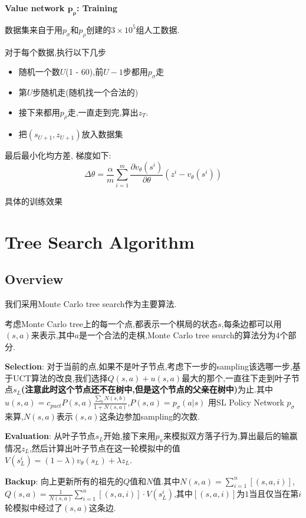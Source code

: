 \documentclass[twocolumn]{article}
\begin{document}
\noindent \textbf{Value network $\bm{p_\rho}$: Training}

数据集来自于用$p_\sigma$和$p_\rho$创建的$3 \times 10^5$组人工数据.

对于每个数据,执行以下几步

\begin{itemize}
	\item 随机一个数$U$(1 - 60),前$U-1$步都用$p_\sigma$走
	\item 第$U$步随机走(随机找一个合法的)
	\item 接下来都用$p_\rho$走,一直走到完,算出$z_T$.
	\item 把$(s_{U+1}, z_{U+1})$放入数据集
\end{itemize}

最后最小化均方差, 梯度如下: 
\[
\Delta\theta = \frac{\alpha}{m} \sum_{i=1}^m\frac{\partial v_\theta(s^i)}{\partial \theta}(z^i - v_\theta(s^i))
\]

\textcolor[rgb]{1,0,0}{具体的训练效果}

\section{Tree Search Algorithm}

\subsection{Overview}

我们采用Monte Carlo tree search作为主要算法.

考虑Monte Carlo tree上的每一个点,都表示一个棋局的状态$s$,每条边都可以用$(s, a)$来表示,其中$a$是一个合法的走棋,Monte Carlo tree search的算法分为4个部分.

\noindent\textbf{Selection}: 对于当前的点,如果不是叶子节点,考虑下一步的sampling该选哪一步,基于UCT算法的改良,我们选择$Q(s, a) + u(s, a)$最大的那个,一直往下走到叶子节点$s_L$\textbf{(注意此时这个节点还不在树中,但是这个节点的父亲在树中)}为止.其中$u(s, a) = c_{puct}P(s, a)\frac{\sum_{b}N(s,b)}{1+N(s,a)}$,$P(s, a)=p_\sigma(a|s)$ 用SL Policy Network $p_\sigma$来算,$N(s,a)$表示$(s,a)$这条边参加sampling的次数.

\noindent\textbf{Evaluation}: 从叶子节点$s_L$开始,接下来用$p_\pi$来模拟双方落子行为,算出最后的输赢情况$z_L$,然后计算出叶子节点在这一轮模拟中的值$V(s_L^i)=(1-\lambda)v_\theta(s_L) + \lambda z_L$.

\noindent\textbf{Backup}: 向上更新所有的祖先的$Q$值和$N$值.其中$N(s, a) = \sum_{i=1}^n[(s,a,i)]$,$Q(s, a) = \frac{1}{N(s,a)}\sum_{i=1}^n{[(s,a,i)] \cdot V(s_L^i)}$,其中$[(s,a,i)]$为$1$当且仅当在第$i$轮模拟中经过了$(s, a)$这条边.
\end{document}

